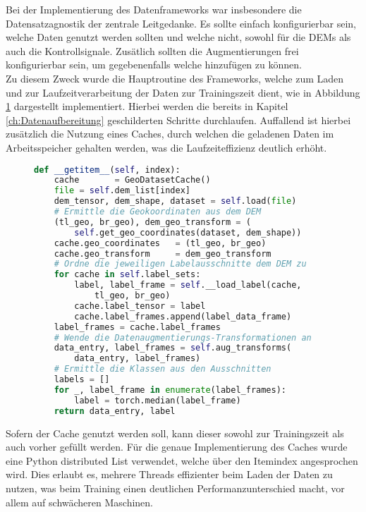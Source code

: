 Bei der Implementierung des Datenframeworks war insbesondere die Datensatzagnostik der zentrale Leitgedanke. Es sollte einfach konfigurierbar sein, welche Daten genutzt werden sollten und welche nicht, sowohl für die \ac{DEM}s als auch die Kontrollsignale. Zusätlich sollten die Augmentierungen frei konfigurierbar sein, um gegebenenfalls welche hinzufügen zu können. \\
Zu diesem Zweck wurde die Hauptroutine des Frameworks, welche zum Laden und zur Laufzeitverarbeitung der Daten zur Trainingszeit dient, wie in Abbildung \ref{fig:Data_runtime} dargestellt implementiert. Hierbei werden die bereits in Kapitel \ref{ch:Datenaufbereitung} geschilderten Schritte durchlaufen. Auffallend ist hierbei zusätzlich die Nutzung eines Caches, durch welchen die geladenen Daten im Arbeitsspeicher gehalten werden, was die Laufzeiteffizienz deutlich erhöht. \\
\begin{figure}[H]
\begin{lstlisting}[language=python, aboveskip=0pt, belowskip=0pt]
def __getitem__(self, index):
    cache       = GeoDatasetCache()
    file = self.dem_list[index]
    dem_tensor, dem_shape, dataset = self.load(file)  
    # Ermittle die Geokoordinaten aus dem DEM
    (tl_geo, br_geo), dem_geo_transform = (
        self.get_geo_coordinates(dataset, dem_shape))    
    cache.geo_coordinates   = (tl_geo, br_geo)
    cache.geo_transform     = dem_geo_transform
    # Ordne die jeweiligen Labelausschnitte dem DEM zu 
    for cache in self.label_sets:
        label, label_frame = self.__load_label(cache, 
            tl_geo, br_geo)
        cache.label_tensor = label
        cache.label_frames.append(label_data_frame)
    label_frames = cache.label_frames
    # Wende die Datenaugmentierungs-Transformationen an 
    data_entry, label_frames = self.aug_transforms(
        data_entry, label_frames)
    # Ermittle die Klassen aus den Ausschnitten 
    labels = []
    for _, label_frame in enumerate(label_frames):
        label = torch.median(label_frame)
    return data_entry, label
\end{lstlisting}
    \captionsetup{type=figure}
    \label{fig:Data_runtime}
\end{figure}
Sofern der Cache genutzt werden soll, kann dieser sowohl zur Trainingszeit als auch vorher gefüllt werden. Für die genaue Implementierung des Caches wurde eine Python distributed List verwendet, welche über den Itemindex angesprochen wird. Dies erlaubt es, mehrere Threads effizienter beim Laden der Daten zu nutzen, was beim Training einen deutlichen Performanzunterschied macht, vor allem auf schwächeren Maschinen. 

